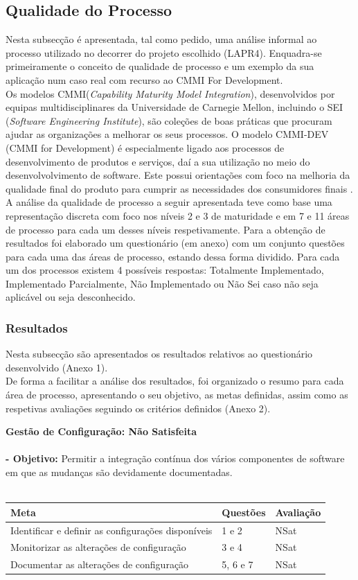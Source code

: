 \documentclass[openany,10pt,a4paper]{article}
\begin{document}
\subsection{Qualidade do Processo}
Nesta subsecção é apresentada, tal como pedido, uma análise informal ao processo utilizado no decorrer do projeto escolhido (LAPR4). Enquadra-se primeiramente o conceito de qualidade de processo e um exemplo da sua aplicação num caso real com recurso ao CMMI For Development. \\
Os modelos CMMI(\textit{Capability Maturity Model Integration}), desenvolvidos por equipas multidisciplinares da Universidade de Carnegie Mellon, incluindo o SEI (\textit{Software Engineering Institute}), são coleções de boas práticas que procuram ajudar as organizações a melhorar os seus processos. O modelo CMMI-DEV (CMMI for Development) é especialmente ligado aos processos de desenvolvimento de produtos e serviços, daí a sua utilização no meio do desenvolvolvimento de software. Este possui orientações com foco na melhoria da qualidade final do produto para cumprir as necessidades dos consumidores finais \cite{CMMIProductTeam2010}.\\ 
A análise da qualidade de processo a seguir apresentada teve como base uma representação discreta com foco nos níveis 2 e 3 de maturidade e em 7 e 11 áreas de processo para cada um desses níveis respetivamente. Para a obtenção de resultados foi elaborado um questionário (em anexo) com um conjunto questões para cada uma das áreas de processo, estando dessa forma dividido. Para cada um dos processos existem 4 possíveis respostas: Totalmente Implementado, Implementado Parcialmente, Não Implementado ou Não Sei caso não seja aplicável ou seja desconhecido.

\subsubsection{Resultados}
Nesta subsecção são apresentados os resultados relativos ao questionário desenvolvido (Anexo 1). \\
De forma a facilitar a análise dos resultados, foi organizado o resumo para cada área de processo, apresentando o seu objetivo, as metas definidas, assim como as respetivas avaliações seguindo os critérios definidos (Anexo 2).

\textbf{Gestão de Configuração: Não Satisfeita} \\ \\
\textbf{- Objetivo:} Permitir a integração contínua dos vários componentes de software em que as mudanças são devidamente documentadas. \\
\\
\begin{tabular}{p{3in}|p{1.5in}|p{1.5in}}
\textbf{Meta} & \textbf{Questões} & \textbf{Avaliação} \\ \hline
Identificar e definir as configurações disponíveis & 1 e 2 & NSat \\
Monitorizar as alterações de configuração  & 3 e 4 & NSat \\
Documentar as alterações de configuração  & 5, 6 e 7 & NSat \\
\end{tabular} \\
\end{document}
